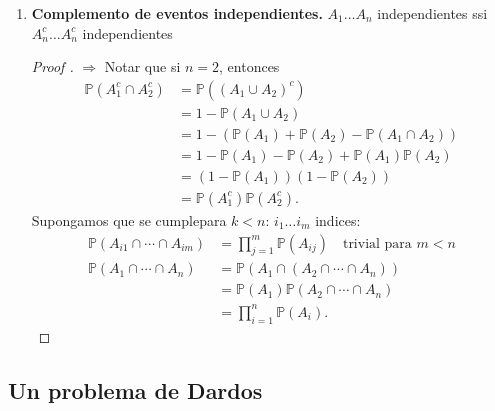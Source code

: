 \begin{enumerate}
	\item \textbf{Complemento de eventos independientes.} $A_1\dots A_n$ independientes ssi $A_n^c \dots A_n^c$ independientes
	\begin{proof}[Proof ]
		$\Rightarrow$ Notar que si $n=2$, entonces
		\begin{align*}
			\mathbb{P}(A_1^c \cap A_2^c) & = \mathbb{P}((A_1\cup A_2)^c) \\
			& = 1 - \mathbb{P}(A_1 \cup A_2) \\
			&= 1 - (\mathbb{P}(A_1) + \mathbb{P}(A_{2}) - \mathbb{P}(A_{1}\cap A_{2})) \\
			&= 1 - \mathbb{P}(A_{1}) - \mathbb{P}(A_{2}) + \mathbb{P}(A_{1})\mathbb{P}(A_{2}) \\
			&= (1-\mathbb{P}(A_{1}))(1 - \mathbb{P}(A_{2})) \\
			&= \mathbb{P}(A_1^c)\mathbb{P}(A_2^c)
		.\end{align*}
		Supongamos que se cumplepara $k<n$: $i_1\dots i_m$ indices:
		\begin{align*}
			\mathbb{P}(A_{i1}\cap \cdots \cap A_{im}) & = \prod_{j=1}^{m} \mathbb{P}(A_{ij}) \quad \text{trivial para } m<n \\
			\mathbb{P}(A_{1}\cap\cdots\cap A_{n}) &= \mathbb{P}(A_{1}\cap (A_{2}\cap\cdots\cap A_n)) \\
			&= \mathbb{P} (A_1)\mathbb{P}(A_{2}\cap\cdots\cap A_n) \\
			&= \prod_{i=1}^{n} \mathbb{P}(A_i)
		.\end{align*}
	\end{proof}
\end{enumerate}

\subsection{Un problema de Dardos}

